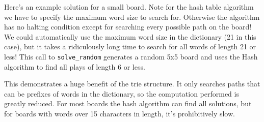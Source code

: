 \documentclass{article}
\begin{document}
Here's an example solution for a small board. Note for the hash table algorithm we have to specify the maximum word size to search for. Otherwise the algorithm has no halting condition except for searching every possible path on the board! We could automatically use the maximum word size in the dictionary (21 in this case), but it takes a ridiculously long time to search for all words of length 21 or less! This call to \verb=solve_random= generates a random 5x5 board and uses the Hash algorithm to find all plays of length 6 or less. 

This demonstrates a huge benefit of the trie structure. It only searches paths that can be prefixes of words in the dictionary, so the computation performed is greatly reduced. For most boards the hash algorithm can find all solutions, but for boards with words over 15 characters in length, it's prohibitively slow. 
\end{document}
